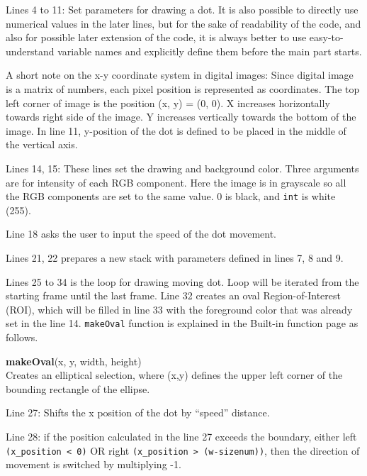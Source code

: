 \documentclass[11pt,a4paper,oneside]{report}
\newenvironment{indentCom}
{\begin{list}{}
         {\setlength{\leftmargin}{1em}}
         \item[]
}
{\end{list}}
\newcommand{\ilcom}[1]{\texttt{\small#1}}
\begin{document}
\begin{itemize}
\item Lines 4 to 11: Set parameters for drawing a dot. It is also possible to directly use numerical values in the later lines, but for the sake of readability of the code, and also for possible later extension of the code, it is always better to use easy-to-understand variable names and explicitly define them before the main part starts. 
\item A short note on the x-y coordinate system in digital images: Since digital image is a matrix of numbers, each pixel position is represented as coordinates. The top left corner of image is the position (x, y) = (0, 0). X increases horizontally towards right side of the image. Y increases vertically towards the bottom of the image.  In line 11, y-position of the dot is defined to be placed in the middle of the vertical axis. 
\item Lines 14, 15: These lines set the drawing and background color. Three arguments are for intensity of each RGB component. Here the image is in grayscale so all the RGB components are set to the same value. 0 is black, and \ilcom{int} is white (255).
\item Line 18 asks the user to input the speed of the dot movement.
\item Lines 21, 22 prepares a new stack with parameters defined in lines 7, 8 and 9.
\item Lines 25 to 34 is the loop for drawing moving dot. Loop will be iterated from the starting frame until the last frame. Line 32 creates an oval Region-of-Interest (ROI), which will be filled in line 33 with the foreground color that was already set in the line 14. \ilcom{makeOval} function is explained in the Built-in function page as follows.

\begin{indentCom}
\textbf{makeOval}(x, y, width, height)\\
Creates an elliptical selection, where (x,y) defines the upper left corner of the bounding rectangle of the ellipse. 
\end{indentCom}
\item Line 27: Shifts the x position of the dot by ``speed'' distance. 
\item Line 28: if the position calculated in the line 27 exceeds the boundary, either left \ilcom{(x\_position < 0)} OR right \ilcom{(x\_position > (w-sizenum))}, then the direction of movement is switched by multiplying -1.
\end{itemize}
\end{document}
